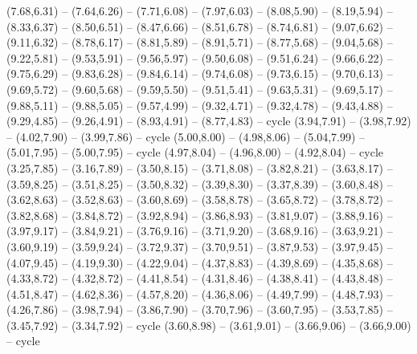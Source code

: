 {(7.68,6.31) -- (7.64,6.26) -- (7.71,6.08) -- (7.97,6.03) -- (8.08,5.90) -- (8.19,5.94) -- (8.33,6.37) -- (8.50,6.51) -- (8.47,6.66) -- (8.51,6.78) -- (8.74,6.81) -- (9.07,6.62) -- (9.11,6.32) -- (8.78,6.17) -- (8.81,5.89) -- (8.91,5.71) -- (8.77,5.68) -- (9.04,5.68) -- (9.22,5.81) -- (9.53,5.91) -- (9.56,5.97) -- (9.50,6.08) -- (9.51,6.24) -- (9.66,6.22) -- (9.75,6.29) -- (9.83,6.28) -- (9.84,6.14) -- (9.74,6.08) -- (9.73,6.15) -- (9.70,6.13) -- (9.69,5.72) -- (9.60,5.68) -- (9.59,5.50) -- (9.51,5.41) -- (9.63,5.31) -- (9.69,5.17) -- (9.88,5.11) -- (9.88,5.05) -- (9.57,4.99) -- (9.32,4.71) -- (9.32,4.78) -- (9.43,4.88) -- (9.29,4.85) -- (9.26,4.91) -- (8.93,4.91) -- (8.77,4.83) -- cycle
  (3.94,7.91) -- (3.98,7.92) -- (4.02,7.90) -- (3.99,7.86) -- cycle
  (5.00,8.00) -- (4.98,8.06) -- (5.04,7.99) -- (5.01,7.95) -- (5.00,7.95) -- cycle
  (4.97,8.04) -- (4.96,8.00) -- (4.92,8.04) -- cycle
  (3.25,7.85) -- (3.16,7.89) -- (3.50,8.15) -- (3.71,8.08) -- (3.82,8.21) -- (3.63,8.17) -- (3.59,8.25) -- (3.51,8.25) -- (3.50,8.32) -- (3.39,8.30) -- (3.37,8.39) -- (3.60,8.48) -- (3.62,8.63) -- (3.52,8.63) -- (3.60,8.69) -- (3.58,8.78) -- (3.65,8.72) -- (3.78,8.72) -- (3.82,8.68) -- (3.84,8.72) -- (3.92,8.94) -- (3.86,8.93) -- (3.81,9.07) -- (3.88,9.16) -- (3.97,9.17) -- (3.84,9.21) -- (3.76,9.16) -- (3.71,9.20) -- (3.68,9.16) -- (3.63,9.21) -- (3.60,9.19) -- (3.59,9.24) -- (3.72,9.37) -- (3.70,9.51) -- (3.87,9.53) -- (3.97,9.45) -- (4.07,9.45) -- (4.19,9.30) -- (4.22,9.04) -- (4.37,8.83) -- (4.39,8.69) -- (4.35,8.68) -- (4.33,8.72) -- (4.32,8.72) -- (4.41,8.54) -- (4.31,8.46) -- (4.38,8.41) -- (4.43,8.48) -- (4.51,8.47) -- (4.62,8.36) -- (4.57,8.20) -- (4.36,8.06) -- (4.49,7.99) -- (4.48,7.93) -- (4.26,7.86) -- (3.98,7.94) -- (3.86,7.90) -- (3.70,7.96) -- (3.60,7.95) -- (3.53,7.85) -- (3.45,7.92) -- (3.34,7.92) -- cycle
  (3.60,8.98) -- (3.61,9.01) -- (3.66,9.06) -- (3.66,9.00) -- cycle
}
